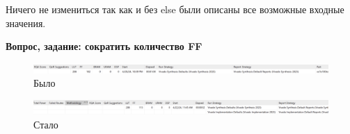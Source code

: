 \documentclass[12pt,onecolumn]{article}
\begin{document}
Ничего не измениться так как и без else были описаны все возможные входные значения. 

\textbf{Вопрос, задание: сократить количество FF}
\begin{figure}[H]
    \includegraphics[width=\textwidth]{image/was.png}
    \caption{Было}
\end{figure}
\begin{figure}[H]
    \includegraphics[width=\textwidth]{image/now.png}
    \caption{Стало}
\end{figure}
\end{document}
